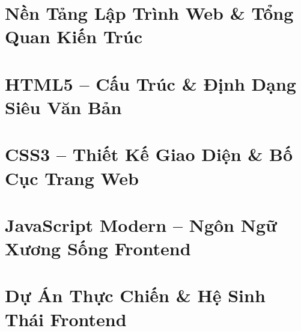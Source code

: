 \documentclass[11pt,oneside]{book}
\begin{document}
\frontmatter
\renewcommand{\contentsname}{MỤC LỤC TÀI LIỆU}
\setcounter{tocdepth}{2}

\tableofcontents
\clearpage

\mainmatter

\part{Nền Tảng Lập Trình Web \& Tổng Quan Kiến Trúc}



\part{HTML5 -- Cấu Trúc \& Định Dạng Siêu Văn Bản}







\part{CSS3 -- Thiết Kế Giao Diện \& Bố Cục Trang Web}






\part{JavaScript Modern -- Ngôn Ngữ Xương Sống Frontend}






\part{Dự Án Thực Chiến \& Hệ Sinh Thái Frontend}



\end{document}
